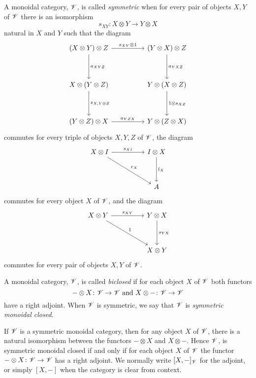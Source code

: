 \documentclass[dissertation.tex]{subfiles}
\begin{document}
\begin{defn}
  A monoidal category, $\mathscr{V}$, is called {\it symmetric} when for every pair of objects $X,Y$ of $\mathscr{V}$ there is an isomorphism
  $$s_{XY} \colon X \otimes Y \to Y \otimes X$$
  natural in $X$ and $Y$ such that the diagram
  $$\begin{tikzcd}
    (X \otimes Y) \otimes Z \arrow{rr}{s_{XY} \otimes 1} \arrow{dd}{a_{XYZ}} && (Y \otimes X) \otimes Z \arrow{dd}{a_{YXZ}}\\
    \\
    X \otimes (Y \otimes Z)\arrow{dd}{s_{X,Y \otimes Z}} && Y \otimes(X \otimes Z)\arrow{dd}{1 \otimes s_{XZ}}\\
    \\
    (Y \otimes Z) \otimes X \arrow{rr}{a_{YZX}} && Y \otimes (Z \otimes X)
  \end{tikzcd}$$
  commutes for every triple of objects $X,Y,Z$ of $\mathscr{V}$, the diagram
  $$\begin{tikzcd}
    X \otimes I  \arrow{rr}{s_{XI}}\arrow{rrdd}{r_X} && I \otimes X \arrow{dd}{l_X}\\
    \\
    && A
  \end{tikzcd}$$
  commutes for every object $X$ of $\mathscr{V}$, and the diagram
  $$\begin{tikzcd}
    X \otimes Y \arrow{rrdd}{1}\arrow{rr}{s_{XY}} && Y \otimes X\arrow{dd}{s_{YX}}\\
    \\
    && X \otimes Y
  \end{tikzcd}$$
  commutes for every pair of objects $X,Y$ of $\mathscr{V}$.
\end{defn}

\begin{defn}
  A monoidal category, $\mathscr{V}$, is called {\it biclosed} if for each object $X$ of $\mathscr{V}$ both functors
  $$- \otimes X \colon \mathscr{V} \to \mathscr{V}\ \text{and}\ X \otimes - \colon \mathscr{V} \to \mathscr{V}$$
  have a right adjoint.
  When $\mathscr{V}$ is symmetric, we say that $\mathscr{V}$ is {\it symmetric monoidal closed}.
\end{defn}

\begin{rmk}
  If $\mathscr{V}$ is a symmetric monoidal category, then for any object $X$ of $\mathscr{V}$, there is a natural isomorphism between the functors $- \otimes X$ and $X \otimes -$.
  Hence $\mathscr{V}$, is symmetric monoidal closed if and only if for each object $X$ of $\mathscr{V}$ the functor $- \otimes X \colon \mathscr{V} \to \mathscr{V}$ has a right adjoint.
  We normally write $[X,-]_{\mathscr{V}}$ for the adjoint, or simply $[X,-]$ when the category is clear from context.
\end{rmk}
\end{document}
